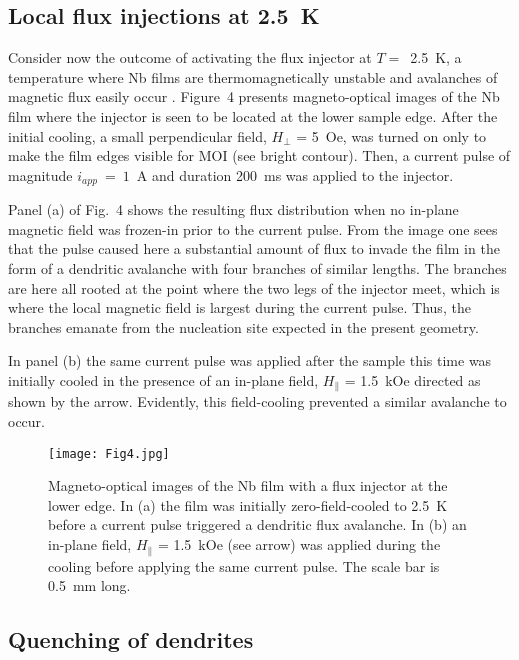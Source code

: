 \documentclass[superscriptaddress,twocolumn,aps,
showpacs]{revtex4-1}
\begin{document}
\subsection{Local flux injections at 2.5~K}

Consider now the outcome of activating the flux injector at $T= $~2.5~K, a temperature where Nb films are thermomagnetically unstable and avalanches of magnetic flux  easily occur \cite{duran95, altshuler_Nb_2004}.
Figure~4  presents magneto-optical images of the Nb film where the injector is seen to be located at the lower sample edge. 
After the initial cooling, a small perpendicular field, $H_{\perp}$ = 5~Oe, was  turned on only to make the film edges visible for MOI (see bright contour).
Then, a current pulse of magnitude $i_{app}~=~1$~A and duration 200~ms was applied to the injector.

Panel (a) of Fig.~4 shows the resulting flux distribution when no in-plane magnetic field was frozen-in prior to the current pulse.
From the image one sees that the pulse caused here a substantial amount of  flux to invade the film in the form of a dendritic avalanche with four branches of similar lengths.
The branches are here all rooted at the point where the two legs of the injector meet, which is where the local magnetic field is largest during the current pulse.
Thus, the branches emanate from the nucleation site expected in the present geometry.

In panel (b) the same current pulse was applied after the sample this time was initially cooled in the presence of an in-plane field, $H_{\parallel}$ = 1.5~kOe  directed as shown by the arrow.
Evidently, this field-cooling prevented a similar avalanche to occur.

\begin{figure}[t]
  \centering
  \texttt{[image: Fig4.jpg]}
  \label{fig:ava-quench}
  \caption{Magneto-optical images of the Nb film with a flux injector at the lower edge.
  In (a) the film was initially zero-field-cooled to 2.5~K before a current pulse triggered a dendritic flux avalanche.
 In (b) an in-plane field,  $H_{\parallel}$ = 1.5~kOe  (see arrow) was applied during the cooling before applying the same current pulse.
 The scale bar is 0.5~mm long. 
  }
\end{figure}

\subsection{Quenching of dendrites}
\end{document}
